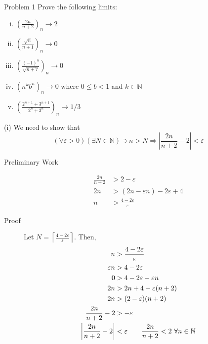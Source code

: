 \documentclass[10pt]{extarticle}
\title{}
\author{Avinash Iyer}
\date{}
\newcommand{\N}{\mathbb{N}}
\begin{document}
  \begin{problem}{Problem 1}
    Prove the following limits:
    \begin{enumerate}[(i)]
      \item $\displaystyle \left(\frac{2n}{n+2}\right)_n \rightarrow 2$
      \item $\displaystyle \left(\frac{\sqrt{n}}{n+1}\right)_n \rightarrow 0$
      \item $\displaystyle \left(\frac{(-1)^n}{\sqrt{n+7}}\right)_n \rightarrow 0$
      \item $\displaystyle \left(n^kb^n\right)_n \rightarrow 0$ where $0\leq b < 1$ and $k\in\N$
      \item $\displaystyle \left(\frac{2^{n+1}+3^{n+1}}{2^n + 3^n}\right)_n \rightarrow 1/3$
    \end{enumerate}
    \tcblower
    \begin{problem}{(i)}
     We need to show that
      \[(\forall \varepsilon > 0)(\exists N\in\N) \ni n > N \Rightarrow \left|\frac{2n}{n+2} - 2\right| < \varepsilon\]
      \begin{description}
        \item[Preliminary Work] 
          \begin{align*}
            \frac{2n}{n+2} &> 2-\varepsilon\\
            2n &> (2n - \varepsilon n) - 2\varepsilon + 4\\
            n &> \frac{4-2\varepsilon}{\varepsilon}
          \end{align*}
        \item[Proof] Let $\displaystyle N = \left\lceil\frac{4-2\varepsilon}{\varepsilon}\right\rceil$. Then,
          \begin{align*}
            n &> \frac{4-2\varepsilon}{\varepsilon}\\
            \varepsilon n &> 4-2\varepsilon\\
            0 &> 4-2\varepsilon-\varepsilon n\\
            2n &> 2n + 4 - \varepsilon (n+2)\\
            2n &> (2-\varepsilon)(n+2)\\
            \frac{2n}{n+2} - 2 &> -\varepsilon\\
            \left|\frac{2n}{n+2}-2\right| &< \varepsilon \tag*{$\displaystyle \frac{2n}{n+2}< 2~\forall n\in\N$} 
          \end{align*}
      \end{description}
    \end{problem}

\end{problem}
\end{document}
